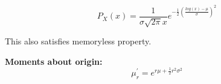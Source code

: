 \documentclass{article}
\begin{document}
$$P_X(x) = \frac{1}{\sigma \sqrt{2\pi}x}e^{-\frac{1}{2}(\frac{log(x)-\mu}{\sigma})^2}$$

This also satisfies memoryless property.

\textbf{Moments about origin:} 
$$\mu_r^\prime=e^{r\mu+\frac{1}{2}r^2\sigma^2}$$



\end{document}
